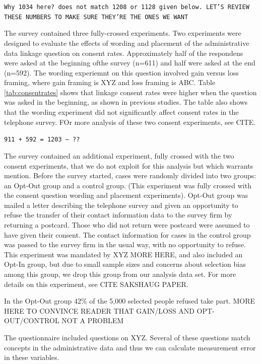 \texttt{Why 1034 here? does not match 1208 or 1128 given below. LET'S REVIEW THESE NUMBERS TO MAKE SURE THEY'RE THE ONES WE WANT}

The survey contained three fully-crossed experiments. Two experiments were designed to evaluate the effects of wording and placement of the administrative data linkage question on consent rates. Approximately half of the respondens were asked at the beginning ofthe survey (n=611) and half were asked at the end (n=592). The wording experiemnt on this question involved gain versus loss framing, where gain framing is XYZ and loss framing is ABC. Table \ref{tab:consentrates} shows that linkage consent rates were higher when the question was asked in the beginning, as shown in previous studies. The table also shows that the wording experiment did not significantly affect consent rates in the telephone survey. FOr more analysis of these two consent experiments, see CITE.

\texttt{911 + 592 = 1203 -- ??}



The survey contained an additional experiment, fully crossed with the two consent experiments, that we do not exploit for this analysis but which warrants mention. Before the survey started, cases were randomly divided into two groups: an Opt-Out group and a control group. (This experiment was fully crossed with the consent question wording and placement experiments). Opt-Out group was mailed a letter describing the telephone survey and given an opportunity to refuse the transfer of their contact information data to the survey firm by returning a postcard. Those who did not return were postcard were assumed to have given their consent. The contact information for cases in the control group was passed to the survey firm in the usual way, with no opportunity to refuse. This experiment was mandated by XYZ MORE HERE, and also included an Opt-In group, but due to small sample sizes and concerns about selection bias among this group, we drop this group from  our analysis data set. For more details on this experiment, see CITE SAKSHAUG PAPER. 

In the Opt-Out group 42\% of the 5,000 selected people refused take part. MORE HERE TO CONVINCE READER THAT GAIN/LOSS AND OPT-OUT/CONTROL NOT A PROBLEM

The questionnaire included questions on XYZ. Several of these questions match concepts in the administrative data and thus we can calculate measurement error in these variables.

